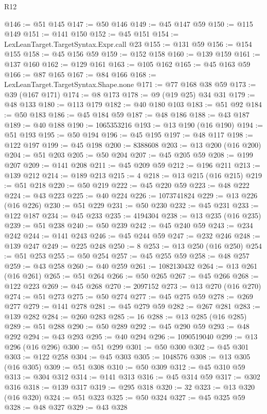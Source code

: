 \begin{lexlean}{R12}
\begin{coremodule}
@146 := @51 @145
@147 := @50 @146
@149 := @45 @147 @59
@150 := @115 @149
@151 := @141 @150
@152 := @45 @151
@154 := LexLeanTarget.TargetSyntax.Expr.call @23
@155 := @131 @59
@156 := @154 @155
@158 := @45 @156 @59
@159 := @152 @158
@160 := @139 @159
@161 := @137 @160
@162 := @129 @161
@163 := @105 @162
@165 := @45 @163 @59
@166 := @87 @165
@167 := @84 @166
@168 := LexLeanTarget.TargetSyntax.Shape.none
@171 := @77 @168 @38 @59
@173 := @39 (@167 @171)
@174 := @8 @173
@178 := @9 (@19 @25) @34 @31
@179 := @48 @133
@180 := @113 @179
@182 := @40 @180 @103
@183 := @51 @92
@184 := @50 @183
@186 := @45 @184 @59
@187 := @48 @186
@188 := @43 @187
@189 := @40 @188
@190 := 1065353216
@193 := @13 @190 (@16 @190)
@194 := @51 @193
@195 := @50 @194
@196 := @45 @195
@197 := @48 @117
@198 := @122 @197
@199 := @45 @198
@200 := 8388608
@203 := @13 @200 (@16 @200)
@204 := @51 @203
@205 := @50 @204
@207 := @45 @205 @59
@208 := @199 @207
@209 := @141 @208
@211 := @45 @209 @59
@212 := @196 @211
@213 := @139 @212
@214 := @189 @213
@215 := 4
@218 := @13 @215 (@16 @215)
@219 := @51 @218
@220 := @50 @219
@222 := @45 @220 @59
@223 := @48 @222
@224 := @43 @223
@225 := @40 @224
@226 := 1073741824
@229 := @13 @226 (@16 @226)
@230 := @51 @229
@231 := @50 @230
@232 := @45 @231
@233 := @122 @187
@234 := @45 @233
@235 := 4194304
@238 := @13 @235 (@16 @235)
@239 := @51 @238
@240 := @50 @239
@242 := @45 @240 @59
@243 := @234 @242
@244 := @141 @243
@246 := @45 @244 @59
@247 := @232 @246
@248 := @139 @247
@249 := @225 @248
@250 := 8
@253 := @13 @250 (@16 @250)
@254 := @51 @253
@255 := @50 @254
@257 := @45 @255 @59
@258 := @48 @257
@259 := @43 @258
@260 := @40 @259
@261 := 1082130432
@264 := @13 @261 (@16 @261)
@265 := @51 @264
@266 := @50 @265
@267 := @45 @266
@268 := @122 @223
@269 := @45 @268
@270 := 2097152
@273 := @13 @270 (@16 @270)
@274 := @51 @273
@275 := @50 @274
@277 := @45 @275 @59
@278 := @269 @277
@279 := @141 @278
@281 := @45 @279 @59
@282 := @267 @281
@283 := @139 @282
@284 := @260 @283
@285 := 16
@288 := @13 @285 (@16 @285)
@289 := @51 @288
@290 := @50 @289
@292 := @45 @290 @59
@293 := @48 @292
@294 := @43 @293
@295 := @40 @294
@296 := 1090519040
@299 := @13 @296 (@16 @296)
@300 := @51 @299
@301 := @50 @300
@302 := @45 @301
@303 := @122 @258
@304 := @45 @303
@305 := 1048576
@308 := @13 @305 (@16 @305)
@309 := @51 @308
@310 := @50 @309
@312 := @45 @310 @59
@313 := @304 @312
@314 := @141 @313
@316 := @45 @314 @59
@317 := @302 @316
@318 := @139 @317
@319 := @295 @318
@320 := 32
@323 := @13 @320 (@16 @320)
@324 := @51 @323
@325 := @50 @324
@327 := @45 @325 @59
@328 := @48 @327
@329 := @43 @328

\end{coremodule}
\end{lexlean}
